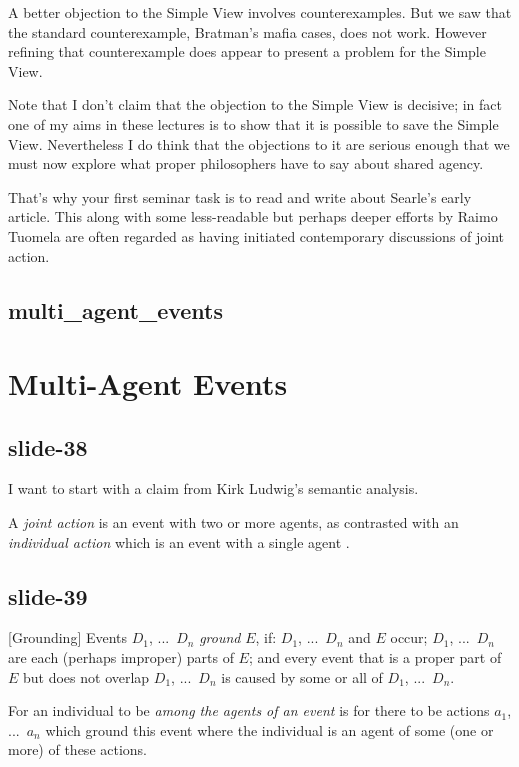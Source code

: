 \documentclass[12pt,\papersize]{extarticle}
\begin{document}
A better objection to the Simple View involves counterexamples.
But we saw that the standard counterexample, Bratman’s mafia cases, does not work.
However refining that counterexample does appear to present a problem for the
Simple View.

Note that I don’t claim that the objection to the Simple View is decisive;
in fact one of my aims in these lectures is to show that it is possible to
save the Simple View.
Nevertheless I do think that the objections to it are serious enough that we
must now explore what proper philosophers have to say about shared agency.

That’s why your first seminar task is to read and write about Searle’s early
article.  This along with some less-readable but perhaps deeper efforts by Raimo Tuomela
are often regarded as having initiated contemporary discussions of joint action.

\subsection{multi\_agent\_events}


\section{Multi-Agent Events}

\subsection{slide-38}
I want to start with a claim from Kirk Ludwig's semantic analysis.

A \emph{joint action} is an event with two or more agents, as contrasted
with an \emph{individual action} which is an event with a single agent
\citep[p.\ 366]{ludwig_collective_2007}.

\subsection{slide-39}
[Grounding]
Events $D_1$, ...\ $D_n$ \emph{ground} $E$, if: $D_1$, ...\ $D_n$ and $E$ occur;
$D_1$, ...\ $D_n$ are each (perhaps improper) parts of $E$; and
every event that is a proper part of $E$ but does not overlap  $D_1$, ...\ $D_n$ is caused by some or all of $D_1$, ...\ $D_n$.

For an individual to be \emph{among the agents of an event} is for there to be actions $a_1$, ...\ $a_n$ which ground this event where the individual is an agent of some (one or more) of these actions.
\end{document}
